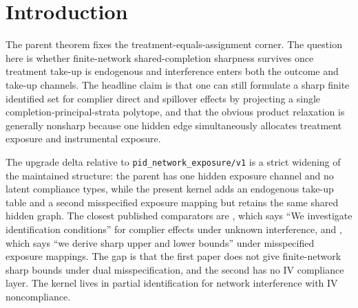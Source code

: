 \documentclass[11pt]{article}
\theoremstyle{definition}
\theoremstyle{plain}
\theoremstyle{remark}
\begin{document}
\begin{abstract}
The banked parent \texttt{pid\_network\_exposure/v1} gives sharp finite-network bounds for average direct effects when the treatment exposure mapping may be misspecified but treatment equals assignment. This proposal asks whether the same shared-completion logic survives when treatment take-up is endogenous, interference enters both the treatment and instrument channels, and both analyst exposure mappings may be wrong. The routine theorem is a finite sharpness statement: under bounded outcomes, exclusion, and exposure-indexed monotonicity, the identified set for a family of complier direct and spillover effects is the projection of one joint completion-principal-strata polytope. The flagship conjecture is that the natural product relaxation, which varies treatment-exposure kernels, instrumental-exposure kernels, and compliance kernels independently, is generically too wide on finite networks because one hidden edge constrains take-up and outcome exposures simultaneously. A second conjecture states that the same polytope jointly sharp-identifies the direct and spillover complier family, whereas coordinatewise endpoint stitching is nonsharp. If resolved, the result would connect the exposure-mapping robustness frontier to IV-with-interference models through a computable finite bound rather than an informal robustness warning.
\end{abstract}

\section{Introduction}
The parent theorem fixes the treatment-equals-assignment corner. The question here is whether finite-network shared-completion sharpness survives once treatment take-up is endogenous and interference enters both the outcome and take-up channels. The headline claim is that one can still formulate a sharp finite identified set for complier direct and spillover effects by projecting a single completion-principal-strata polytope, and that the obvious product relaxation is generally nonsharp because one hidden edge simultaneously allocates treatment exposure and instrumental exposure.

The upgrade delta relative to \texttt{pid\_network\_exposure/v1} is a strict widening of the maintained structure: the parent has one hidden exposure channel and no latent compliance types, while the present kernel adds an endogenous take-up table and a second misspecified exposure mapping but retains the same shared hidden graph. The closest published comparators are \citet[Abstract]{hoshino_yanagi_2024_noncompliance_unknown_interference}, which says ``We investigate identification conditions'' for complier effects under unknown interference, and \citet[Abstract]{schroder_oprescu_feuerriegel_kallus_2026_networks_partialid}, which says ``we derive sharp upper and lower bounds'' under misspecified exposure mappings. The gap is that the first paper does not give finite-network sharp bounds under dual misspecification, and the second has no IV compliance layer. The kernel lives in partial identification for network interference with IV noncompliance.
\end{document}

